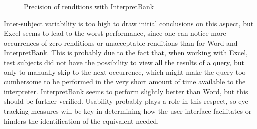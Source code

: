 \documentclass[output=paper]{langsci/langscibook}
\begin{document}
\begin{figure}[p]
\caption{Precision of renditions with InterpretBank \label{fig:prandi:14}}
\end{figure}

Inter-subject variability is too high to draw initial conclusions on this aspect, but Excel seems to lead to the worst performance, since one can notice more occurrences of zero renditions or unacceptable renditions than for Word and InterpretBank. This is probably due to the fact that, when working with Excel, test subjects did not have the possibility to view all the results of a query, but only to manually skip to the next occurrence, which might make the query too cumbersome to be performed in the very short amount of time available to the interpreter. InterpretBank seems to perform slightly better than Word, but this should be further verified. Usability probably plays a role in this respect, so eye-tracking measures will be key in determining how the user interface facilitates or hinders the identification of the equivalent needed.
\end{document}

